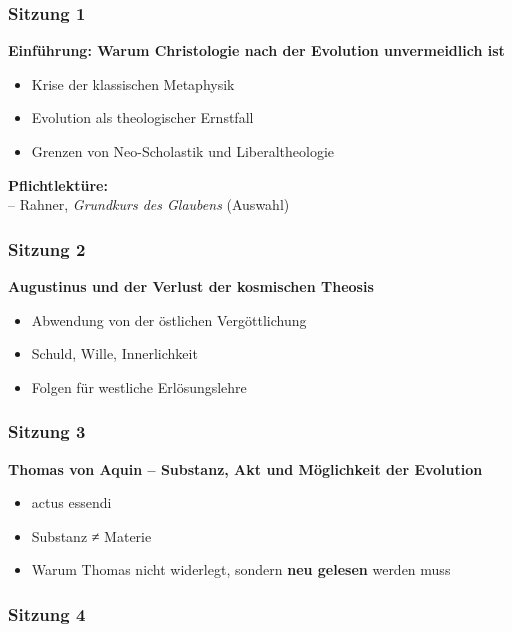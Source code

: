 \documentclass[
]{article}
\begin{document}
\subsubsection{\texorpdfstring{\textbf{Sitzung 1}}{Sitzung 1}}\label{sitzung-1}

\textbf{Einführung: Warum Christologie nach der Evolution unvermeidlich ist}

\begin{itemize}
\item
  Krise der klassischen Metaphysik
\item
  Evolution als theologischer Ernstfall
\item
  Grenzen von Neo-Scholastik und Liberaltheologie
\end{itemize}

\textbf{Pflichtlektüre:\\
}-- Rahner, \emph{Grundkurs des Glaubens} (Auswahl)

\subsubsection{\texorpdfstring{\textbf{Sitzung 2}}{Sitzung 2}}\label{sitzung-2}

\textbf{Augustinus und der Verlust der kosmischen Theosis}

\begin{itemize}
\item
  Abwendung von der östlichen Vergöttlichung
\item
  Schuld, Wille, Innerlichkeit
\item
  Folgen für westliche Erlösungslehre
\end{itemize}

\subsubsection{\texorpdfstring{\textbf{Sitzung 3}}{Sitzung 3}}\label{sitzung-3}

\textbf{Thomas von Aquin -- Substanz, Akt und Möglichkeit der Evolution}

\begin{itemize}
\item
  actus essendi
\item
  Substanz ≠ Materie
\item
  Warum Thomas nicht widerlegt, sondern \textbf{neu gelesen} werden muss
\end{itemize}

\subsubsection{\texorpdfstring{\textbf{Sitzung 4}}{Sitzung 4}}\label{sitzung-4}
\end{document}
